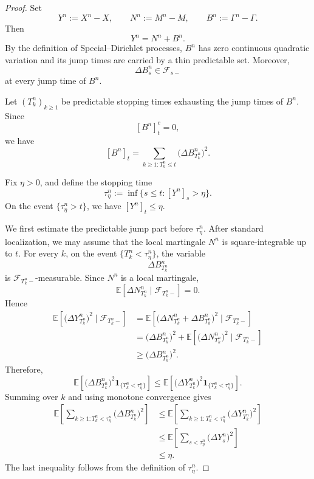 \documentclass[10pt,a4paper]{amsart}
\begin{document}
\begin{proof}
Set
\[
        Y^n:=X^n-X,\qquad
        N^n:=M^n-M,\qquad
        B^n:=\Gamma^n-\Gamma .
\]
Then
\[
        Y^n=N^n+B^n .
\]
By the definition of Special--Dirichlet processes, \(B^n\) has zero
continuous quadratic variation and its jump times are carried by a thin
predictable set. Moreover,
\[
        \Delta B^n_s\in\mathcal F_{s-}
\]
at every jump time of \(B^n\).

Let \((T^n_k)_{k\ge1}\) be predictable stopping times exhausting the jump
times of \(B^n\). Since
\[
        [B^n]^c_t=0,
\]
we have
\[
        [B^n]_t
        =
        \sum_{k\ge1:T^n_k\le t}
        \bigl(\Delta B^n_{T^n_k}\bigr)^2 .
\]

Fix \(\eta>0\), and define the stopping time
\[
        \tau^n_\eta
        :=
        \inf\{s\le t:[Y^n]_s>\eta\}.
\]
On the event \(\{\tau^n_\eta>t\}\), we have \([Y^n]_t\le \eta\).

We first estimate the predictable jump part before \(\tau^n_\eta\). After
standard localization, we may assume that the local martingale \(N^n\) is
square-integrable up to \(t\). For every \(k\), on the event
\(\{T^n_k<\tau^n_\eta\}\), the variable
\[
        \Delta B^n_{T^n_k}
\]
is \(\mathcal F_{T^n_k-}\)-measurable. Since \(N^n\) is a local martingale,
\[
        \mathbb E\!\left[
        \Delta N^n_{T^n_k}
        \mid
        \mathcal F_{T^n_k-}
        \right]
        =0 .
\]
Hence
\[
\begin{aligned}
\mathbb E\!\left[
        \bigl(\Delta Y^n_{T^n_k}\bigr)^2
        \mid
        \mathcal F_{T^n_k-}
        \right]
&=
\mathbb E\!\left[
        \bigl(\Delta N^n_{T^n_k}
        +
        \Delta B^n_{T^n_k}\bigr)^2
        \mid
        \mathcal F_{T^n_k-}
        \right]
\\
&=
        \bigl(\Delta B^n_{T^n_k}\bigr)^2
        +
        \mathbb E\!\left[
        \bigl(\Delta N^n_{T^n_k}\bigr)^2
        \mid
        \mathcal F_{T^n_k-}
        \right]
\\
&\ge
        \bigl(\Delta B^n_{T^n_k}\bigr)^2 .
\end{aligned}
\]
Therefore,
\[
        \mathbb E\!\left[
        \bigl(\Delta B^n_{T^n_k}\bigr)^2
        \mathbf 1_{\{T^n_k<\tau^n_\eta\}}
        \right]
        \le
        \mathbb E\!\left[
        \bigl(\Delta Y^n_{T^n_k}\bigr)^2
        \mathbf 1_{\{T^n_k<\tau^n_\eta\}}
        \right].
\]
Summing over \(k\) and using monotone convergence gives
\[
\begin{aligned}
\mathbb E\!\left[
        \sum_{k\ge1:T^n_k<\tau^n_\eta}
        \bigl(\Delta B^n_{T^n_k}\bigr)^2
        \right]
&\le
\mathbb E\!\left[
        \sum_{k\ge1:T^n_k<\tau^n_\eta}
        \bigl(\Delta Y^n_{T^n_k}\bigr)^2
        \right]
\\
&\le
\mathbb E\!\left[
        \sum_{s<\tau^n_\eta}
        \bigl(\Delta Y^n_s\bigr)^2
        \right]
\\
&\le
\eta .
\end{aligned}
\]
The last inequality follows from the definition of \(\tau^n_\eta\).


\end{proof}
\end{document}
